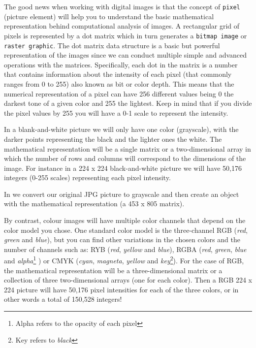 The good news when working with digital images is that the concept of \texttt{pixel} (picture element) will help you to understand the basic mathematical representation behind computational analysis of images. A rectangular grid of pixels is represented by a dot matrix which in turn generates a \texttt{bitmap image} or \texttt{raster graphic}. The dot matrix data structure is a basic but powerful representation of the images since we can conduct multiple simple and advanced operations with the matrices. Specifically, each dot in the matrix is a number that contains information about the intensity of each pixel (that commonly ranges from 0 to 255) also known as bit or color depth. This means that the numerical representation of a pixel can have 256 different values being 0 the darkest tone of a given color and 255 the lightest. Keep in mind that if you divide the pixel values by 255 you will have a 0-1 scale to represent the intensity.

In a blank-and-white picture we will only have one color (grayscale), with the darker points representing the black and the lighter ones the white. The mathematical representation will be a single matrix or a two-dimensional array in which the number of rows and columns will correspond to the dimensions of the image. For instance in a 224 x 224 black-and-white picture we will have 50,176 integers (0-255 scales) representing each pixel intensity. 

In  we convert our original JPG picture to grayscale and then create an object with the mathematical representation (a 453 x 805 matrix).


By contrast, colour images will have multiple color channels that depend on the color model you chose. One standard color model is the  three-channel RGB (\textit{red}, \textit{green} and \textit{blue}), but you can find other variations in the chosen colors and the number of channels such as: RYB (\textit{red}, \textit{yellow} and \textit{blue}), RGBA (\textit{red}, \textit{green}, \textit{blue} and \textit{alpha}\footnote{Alpha refers to the opacity of each pixel} ) or CMYK (\textit{cyan}, \textit{magneta}, \textit{yellow} and \textit{key}\footnote{Key refers to \textit{black}}).  For the case of RGB, the mathematical representation will be a three-dimensional matrix or a collection of three two-dimensional arrays (one for each color). Then a RGB 224 x 224 picture will have 50,176 pixel intensities for each of the three colors, or in other words a total of 150,528 integers!

